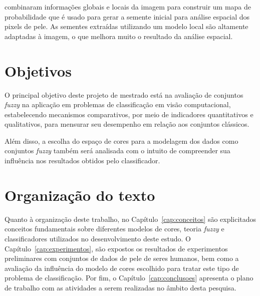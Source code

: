 \citet{kawulok:13} combinaram informações globais e locais da imagem para construir um mapa de probabilidade que é usado para gerar a semente inicial para análise espacial dos pixels de pele. As sementes extraídas utilizando um modelo local são altamente adaptadas à imagem, o que melhora muito o resultado da análise espacial.

\section{Objetivos}
\label{sec:objetivo}

O principal objetivo deste projeto de mestrado está na avaliação de conjuntos \emph{fuzzy} na aplicação em problemas de classificação em visão computacional, estabelecendo mecanismos comparativos, por meio de indicadores quantitativos e qualitativos, para mensurar seu desempenho em relação aos conjuntos clássicos.

Além disso, a escolha do espaço de cores para a modelagem dos dados como conjuntos \emph{fuzzy} também será analisada com o intuito de compreender sua influência nos resultados obtidos pelo classificador.


\section{Organização do texto}
\label{sec:organizacao_trabalho}

Quanto à organização deste trabalho, no Capítulo~\ref{cap:conceitos} são explicitados conceitos fundamentais sobre diferentes modelos de cores, teoria \emph{fuzzy} e classificadores utilizados no desenvolvimento deste estudo. O Capítulo~\ref{cap:experimentos}, são expostos os resultados de experimentos preliminares com conjuntos de dados de pele de seres humanos, bem como a avaliação da influência do modelo de cores escolhido para tratar este tipo de problema de classificação. Por fim, o Capítulo~\ref{cap:conclusoes} apresenta o plano de trabalho com as atividades a serem realizadas no âmbito desta pesquisa.
